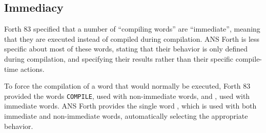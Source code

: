 \subsection{Immediacy} %
\label{diff:immediate}

Forth 83 specified that a number of ``compiling words'' are
``immediate'', meaning that they are executed instead of compiled
during compilation. ANS Forth is less specific about most of these
words, stating that their behavior is only defined during compilation,
and specifying their results rather than their specific compile-time
actions.

To force the compilation of a word that would normally be executed,
Forth 83 provided the words \linebreak \texttt{COMPILE}, used with non-immediate
words, and \word{[COMPILE]}, used with immediate words. ANS Forth
provides the single word , which is used with both
immediate and non-immediate words, automatically selecting the
appropriate behavior.

